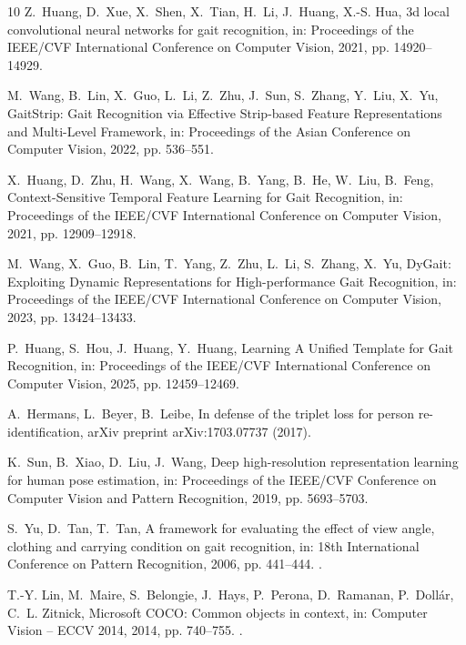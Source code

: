\documentclass[review,12pt]{elsarticle}
\begin{document}
\begin{thebibliography}{10}
Z.~Huang, D.~Xue, X.~Shen, X.~Tian, H.~Li, J.~Huang, X.-S. Hua, 3d local
  convolutional neural networks for gait recognition, in: {Proceedings of the
  IEEE/CVF International Conference on Computer Vision}, 2021, pp.
  14920--14929.

M.~Wang, B.~Lin, X.~Guo, L.~Li, Z.~Zhu, J.~Sun, S.~Zhang, Y.~Liu, X.~Yu,
  {GaitStrip: Gait Recognition via Effective Strip-based Feature
  Representations and Multi-Level Framework}, in: {Proceedings of the Asian
  Conference on Computer Vision}, 2022, pp. 536--551.

X.~Huang, D.~Zhu, H.~Wang, X.~Wang, B.~Yang, B.~He, W.~Liu, B.~Feng,
  {Context-Sensitive Temporal Feature Learning for Gait Recognition}, in:
  {Proceedings of the IEEE/CVF International Conference on Computer Vision},
  2021, pp. 12909--12918.

M.~Wang, X.~Guo, B.~Lin, T.~Yang, Z.~Zhu, L.~Li, S.~Zhang, X.~Yu, {DyGait:
  Exploiting Dynamic Representations for High-performance Gait Recognition},
  in: {Proceedings of the IEEE/CVF International Conference on Computer
  Vision}, 2023, pp. 13424--13433.

P.~Huang, S.~Hou, J.~Huang, Y.~Huang, {Learning A Unified Template for Gait
  Recognition}, in: {Proceedings of the IEEE/CVF International Conference on
  Computer Vision}, 2025, pp. 12459--12469.

A.~Hermans, L.~Beyer, B.~Leibe, In defense of the triplet loss for person
  re-identification, {arXiv preprint arXiv:1703.07737} (2017).

K.~Sun, B.~Xiao, D.~Liu, J.~Wang, Deep high-resolution representation learning
  for human pose estimation, in: {Proceedings of the IEEE/CVF Conference on
  Computer Vision and Pattern Recognition}, 2019, pp. 5693--5703.

S.~Yu, D.~Tan, T.~Tan, A framework for evaluating the effect of view angle,
  clothing and carrying condition on gait recognition, in: {18th International
  Conference on Pattern Recognition}, 2006, pp. 441--444.
\newblock \href {https://doi.org/10.1109/ICPR.2006.67}
  {}.

T.-Y. Lin, M.~Maire, S.~Belongie, J.~Hays, P.~Perona, D.~Ramanan,
  P.~Doll{\'a}r, C.~L. Zitnick, Microsoft {COCO}: Common objects in context,
  in: {Computer Vision -- ECCV 2014}, 2014, pp. 740--755.
\newblock \href {https://doi.org/10.1007/978-3-319-10602-1_48}
  {}.


\end{thebibliography}
\end{document}

